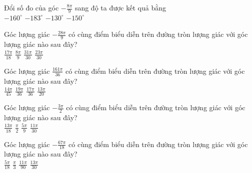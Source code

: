 \documentclass[12pt,a4paper]{article}
\begin{document}
\begin{ex}
 Đổi số đo của góc $- \frac{8 \pi}{9}$ sang độ ta được kết quả bằng\\ 
\choice
{ \True $-160^\circ$ }
   { $-183^\circ$ }
     { $-130^\circ$ }
    { $-150^\circ$ }
\end{ex}

\begin{ex}
 Góc lượng giác $- \frac{28 \pi}{9}$ có cùng điểm biểu diễn trên đường tròn lượng giác với góc lượng giác nào sau đây?\\ 
\choice
{ $\frac{17 \pi}{18}$ }
   { \True $\frac{8 \pi}{9}$ }
     { $\frac{31 \pi}{30}$ }
    { $\frac{23 \pi}{30}$ }
\end{ex}

\begin{ex}
 Góc lượng giác $\frac{161 \pi}{36}$ có cùng điểm biểu diễn trên đường tròn lượng giác với góc lượng giác nào sau đây?\\ 
\choice
{ $\frac{14 \pi}{45}$ }
   { $\frac{19 \pi}{36}$ }
     { \True $\frac{17 \pi}{36}$ }
    { $\frac{13 \pi}{20}$ }
\end{ex}

\begin{ex}
 Góc lượng giác $- \frac{3 \pi}{2}$ có cùng điểm biểu diễn trên đường tròn lượng giác với góc lượng giác nào sau đây?\\ 
\choice
{ $\frac{13 \pi}{18}$ }
   { \True $\frac{\pi}{2}$ }
     { $\frac{5 \pi}{9}$ }
    { $\frac{11 \pi}{30}$ }
\end{ex}

\begin{ex}
 Góc lượng giác $- \frac{67 \pi}{18}$ có cùng điểm biểu diễn trên đường tròn lượng giác với góc lượng giác nào sau đây?\\ 
\choice
{ \True $\frac{5 \pi}{18}$ }
   { $\frac{\pi}{3}$ }
     { $\frac{11 \pi}{90}$ }
    { $\frac{13 \pi}{30}$ }
\end{ex}
\end{document}
